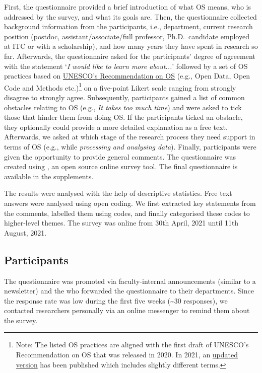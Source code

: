 \documentclass[gc, manuscript]{copernicus}
\begin{document}
First, the questionnaire provided a brief introduction of what OS means,
who is addressed by the survey, and what its goals are. Then, the
questionnaire collected background information from the participants,
i.e., department, current research position (postdoc,
assistant/associate/full professor, Ph.D.~candidate employed at ITC or
with a scholarship), and how many years they have spent in research so
far. Afterwards, the questionnaire asked for the participants' degree of
agreement with the statement
`\textit{I would like to learn more about...}' followed by a set of OS
practices based on
\href{https://unesdoc.unesco.org/ark:/48223/pf0000374409}{UNESCO's
Recommendation on OS} (e.g., Open Data, Open Code and Methods
etc.)\footnote{Note: The listed OS practices are aligned with the first
  draft of UNESCO's Recommendation on OS that was released in 2020. In
  2021, an
  \href{https://en.unesco.org/science-sustainable-future/open-science/recommendation}{updated
  version} has been published which includes slightly different terms.}
on a five-point Likert scale ranging from strongly disagree to strongly
agree. Subsequently, participants gained a list of common obstacles
relating to OS (e.g., \textit{It takes too much time}) and were asked to
tick those that hinder them from doing OS. If the participants ticked an
obstacle, they optionally could provide a more detailed explanation as a
free text. Afterwards, we asked at which stage of the research process
they need support in terms of OS (e.g., while
\textit{processing and analysing data}). Finally, participants were
given the opportunity to provide general comments. The questionnaire was
created using
\href{https://www.limesurvey.org/de/}{\color{blue}{LimeSurvey}}, an open
source online survey tool. The final questionnaire is available in the
supplements.

The results were analysed with the help of descriptive statistics. Free
text answers were analysed using open coding. We first extracted key
statements from the comments, labelled them using codes, and finally
categorised these codes to higher-level themes. The survey was online
from 30th April, 2021 until 11th August, 2021.

\subsection{Participants}

The questionnaire was promoted via faculty-internal announcements
(similar to a newsletter) and the
\href{https://www.itc.nl/research/open-science/about/user-committee/}{\color{blue}{OS@ITC User Committee}}
who forwarded the questionnaire to their departments. Since the response
rate was low during the first five weeks (\textasciitilde30 responses),
we contacted researchers personally via an online messenger to remind
them about the survey.
\end{document}
